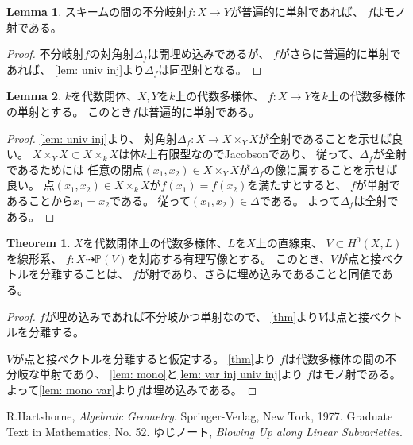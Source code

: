 \documentclass[uplatex]{jsarticle}
\theoremstyle{definition}
\newtheorem{thm}{Theorem}[section]
\newtheorem{lem}[lem]{Lemma}
\renewcommand{\P}{\mathbb{P}}
\newcommand{\dto}{\dashrightarrow}
\begin{document}
\begin{lem}\label{lem: mono}
  スキームの間の不分岐射\(f:X\to Y\)が普遍的に単射であれば、
  \(f\)はモノ射である。
\end{lem}

\begin{proof}
  不分岐射\(f\)の対角射\(\Delta_f\)は開埋め込みであるが、
  \(f\)がさらに普遍的に単射であれば、
  \autoref{lem: univ inj}より\(\Delta_f\)は同型射となる。
\end{proof}



\begin{lem}\label{lem: var inj univ inj}
  \(k\)を代数閉体、\(X,Y\)を\(k\)上の代数多様体、
  \(f:X\to Y\)を\(k\)上の代数多様体の単射とする。
  このとき\(f\)は普遍的に単射である。
\end{lem}

\begin{proof}
  \autoref{lem: univ inj}より、
  対角射\(\Delta_f:X\to X\times_Y X\)が全射であることを示せば良い。
  \(X\times_YX\subset X\times_kX\)は体\(k\)上有限型なのでJacobsonであり、
  従って、\(\Delta_f\)が全射であるためには
  任意の閉点\((x_1,x_2)\in X\times_YX\)が\(\Delta_f\)の像に属することを示せば良い。
  点\((x_1,x_2)\in X\times_kX\)が\(f(x_1)=f(x_2)\)を満たすとすると、
  \(f\)が単射であることから\(x_1=x_2\)である。
  従って\((x_1,x_2)\in \Delta\)である。
  よって\(\Delta_f\)は全射である。
\end{proof}



\begin{thm}
  \(X\)を代数閉体上の代数多様体、\(L\)を\(X\)上の直線束、
  \(V\subset H^0(X,L)\)を線形系、
  \(f:X\dto \P(V)\)を対応する有理写像とする。
  このとき、\(V\)が点と接ベクトルを分離することは、
  \(f\)が射であり、さらに埋め込みであることと同値である。
\end{thm}

\begin{proof}
  \(f\)が埋め込みであれば不分岐かつ単射なので、
  \autoref{thm}より\(V\)は点と接ベクトルを分離する。

  \(V\)が点と接ベクトルを分離すると仮定する。
  \autoref{thm}より
  \(f\)は代数多様体の間の不分岐な単射であり、
  \autoref{lem: mono}と\autoref{lem: var inj univ inj}より
  \(f\)はモノ射である。
  よって\autoref{lem: mono var}より\(f\)は埋め込みである。
\end{proof}





\begin{thebibliography}{9}
  R.Hartshorne,
  \textit{Algebraic Geometry}.
  Springer-Verlag, New Tork, 1977. Graduate Text in Mathematics, No. 52.
  ゆじノート,
  \textit{Blowing Up along Linear Subvarieties}.
\end{thebibliography}
\end{document}
